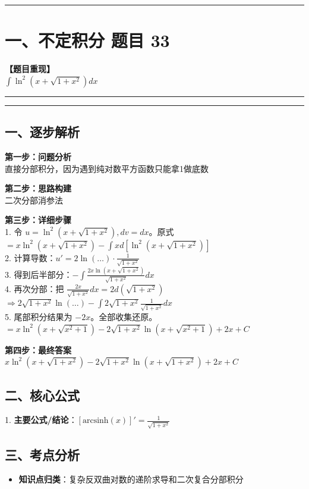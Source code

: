 ﻿\documentclass[12pt, a4paper]{ctexart}
\newcommand{\TopSeparator}{
    \par\noindent\rule{\textwidth}{1.5pt}\vspace{0.5em}
}
\newcommand{\AnalysisSeparator}{
    \par\noindent\rule{\textwidth}{0.5pt}\vspace{0.2em}\hrule\vspace{0.5em}
}
\newenvironment{RedAnalysis}{
    \par
    \color{red} 
}{
    \par
    \color{black} 
}
\begin{document}
\vspace{2em}

\TopSeparator
\section*{一、不定积分 题目 33}

\textbf{【题目重现】} \\
$\int \ln^2(x+\sqrt{1+x^2}) dx$

\AnalysisSeparator

\begin{RedAnalysis}

	\subsection*{一、逐步解析}

	\textbf{第一步：问题分析} \\
	直接分部积分，因为遇到纯对数平方函数只能拿1做底数

	\textbf{第二步：思路构建} \\
	二次分部消参法

	\textbf{第三步：详细步骤} \\
	1. 令 $u = \ln^2(x+\sqrt{1+x^2}), dv = dx$。原式 $= x \ln^2(x+\sqrt{1+x^2}) - \int x d[\ln^2(x+\sqrt{1+x^2})]$ \\ 
	2. 计算导数：$u' = 2\ln(\dots) \cdot \frac{1}{\sqrt{1+x^2}}$ \\ 
	3. 得到后半部分：$- \int \frac{2x\ln(x+\sqrt{1+x^2})}{\sqrt{1+x^2}} dx$ \\ 
	4. 再次分部：把 $\frac{2x}{\sqrt{1+x^2}} dx = 2d(\sqrt{1+x^2})$ \\ 
	$\Rightarrow 2\sqrt{1+x^2}\ln(\dots) - \int 2\sqrt{1+x^2} \frac{1}{\sqrt{1+x^2}} dx$ \\ 
	5. 尾部积分结果为 $-2x$。全部收集还原。$= x\ln^2(x+\sqrt{x^2+1}) - 2\sqrt{1+x^2}\ln(x+\sqrt{x^2+1}) + 2x + C$

	\textbf{第四步：最终答案} \\
	$x\ln^2(x+\sqrt{1+x^2}) - 2\sqrt{1+x^2}\ln(x+\sqrt{1+x^2}) + 2x + C$

	\subsection*{二、核心公式}
	1. \textbf{主要公式/结论}：$[\text{arcsinh}(x)]' = \frac{1}{\sqrt{1+x^2}}$

	\subsection*{三、考点分析}
	\begin{itemize}
		\item \textbf{知识点归类}：复杂反双曲对数的递阶求导和二次复合分部积分
	\end{itemize}

\end{RedAnalysis}
\end{document}

